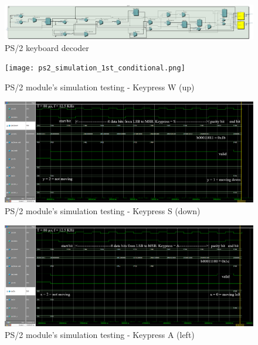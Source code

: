 \documentclass[12pt]{article}
\numberwithin{figure}{subsection}
\begin{document}
\begin{figure}[ht]
  \centering
  \includegraphics[width=\textwidth]{ps2.jpg}
  \caption{PS/2 keyboard decoder}
  \label{fig:ps2}
\end{figure}

\begin{figure}[ht]
  \centering
  \texttt{[image: ps2\_simulation\_1st\_conditional.png]}
  \caption{PS/2 module’s simulation testing - Keypress W (up)}
  \label{fig:ps2_simulation_1st_conditional}
\end{figure}

\newpage

\begin{figure}[ht]
  \centering
  \includegraphics[width=\textwidth]{ps2_simulation_3rd_conditional.png}
  \caption{PS/2 module’s simulation testing - Keypress S (down)}
  \label{fig:ps2_simulation_3rd_conditional}
\end{figure}

\begin{figure}[ht]
  \centering
  \includegraphics[width=\textwidth]{ps2_simulation_5th_conditional.png}
  \caption{PS/2 module’s simulation testing - Keypress A (left)}
  \label{fig:ps2_simulation_5th_conditional}
\end{figure}
\end{document}
